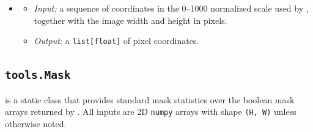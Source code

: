 \begin{itemize}[leftmargin=1.5em]
  \begin{itemize}
  \item \emph{Input:} a \texttt{(H, W, 3)} or \texttt{(N, 3)} point cloud and a matching confidence array; thresholds and iteration count are optional.
  \item \emph{Output:} \texttt{(plane\_normal, inlier\_mask)} via RANSAC~\citep{fischler1981random}, or \texttt{(None, None)} when fitting fails. The sign of \texttt{plane\_normal} is unspecified and is disambiguated by the caller.
  \end{itemize}
\item {}
  \begin{itemize}
  \item \emph{Input:} a sequence of coordinates in the 0--1000 normalized scale used by , together with the image width and height in pixels.
  \item \emph{Output:} a \texttt{list[float]} of pixel coordinates.
  \end{itemize}
\end{itemize}

\subsection{\texttt{tools.Mask}}
\label{app:tool_mask}
 is a static class that provides standard mask statistics over the boolean mask arrays returned by . All inputs are 2D \texttt{numpy} arrays with shape \texttt{(H, W)} unless otherwise noted.

